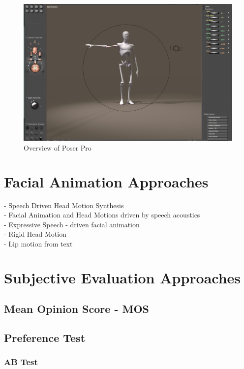 \documentclass[bsc,frontabs,twoside,singlespacing,parskip]{infthesis}
\begin{document}
\begin{figure}
	\centering
		\includegraphics[width=1.0\textwidth]{poser.png}
		\caption{Overview of Poser Pro}
\end{figure}

\section{Facial Animation Approaches}

- Speech Driven Head Motion Synthesis \cite{speech_driven_head_motion}\\
- Facial Animation and Head Motions driven by speech acoustics \cite{facial_animation_acoustics}\\
- Expressive Speech - driven facial animation \cite{expressive_speech_animation}\\
- Rigid Head Motion \cite{rigid_head_motion} \\
- Lip motion from text \cite{lip_motion}

\section{Subjective Evaluation Approaches}

\subsection{Mean Opinion Score - MOS}
\cite{mos}
\subsection{Preference Test}
\subsubsection{AB Test}
\end{document}
